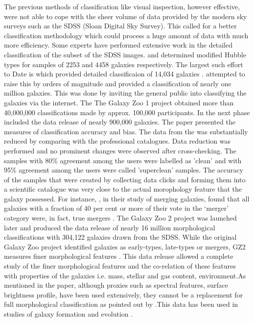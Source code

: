 \documentclass[fleqn,usenatbib]{mnras}
\begin{document}
The previous methods of classification like visual inspection, however effective, were not able to cope with the sheer volume of data provided by the modern sky surveys such as the SDSS (Sloan Digital Sky Survey). This called for a better classification methodology which could process a huge amount of data with much more efficiency. Some experts have performed extensive work in the detailed classification of the subset of the SDSS images. \citet{2007AJ....134..579F} and \citet{refId0} determined modified Hubble types for samples of 2253 and 4458 galaxies respectively. The largest such effort to Date is \citet{2010ApJS..186..427N} which provided detailed classificaion of 14,034 galaxies \citep{Willett_2013}. \citet{2008MNRAS.389.1179L} attempted to raise this by orders of magnitude and provided a classification of nearly one million galaxies. This was done by inviting the general public into classifying the galaxies via the internet. The The Galaxy Zoo 1 project obtained more than 40,000,000 classifications made by approx. 100,000 participants. In the next phase \citet{Lintott_2010} included the data release of nearly 900,000 galaxies. The paper presented the measures of classification accuracy and bias. The data from the \citet{2008MNRAS.389.1179L} was substantially reduced by comparing with the professional catalogues. Data reduction was performed and no prominent changes were observed after cross-checking. The samples with 80\% agreement among the users were labelled as 'clean' and with 95\% agreement among the users were called 'superclean' samples. The accuracy of the samples that were created by collecting data clicks and forming them into a scientific catalogue was very close to the actual morophology feature that the galaxy possessed. For instance, \citet{2010MNRAS.401.1552D}, in their study of merging galaxies, found that
all galaxies with a fraction of 40 per cent or more of their vote in the
‘merger’ category were, in fact, true mergers \citep{Lintott_2010}. The Galaxy Zoo 2 project was launched later and \citet{Willett_2013} produced the data release of nearly 16 million morphological classifications with 304,122 galaxies drawn from the SDSS. While the original Galaxy Zoo project identified galaxies as early-types, late-types or mergers, GZ2 measures finer morphological features \citep{Willett_2013}. This data release allowed a complete study of the finer morphological features and the co-relation of these features with properties of the galaxies i.e. mass, stellar and gas content, environment.As mentioned in the paper, although proxies such as spectral features, surface brightness profile, have been used extensively, they cannot be a replacement for full morphological classification as pointed out by \citet{Lintott_2010}.This data has been used in studies of galaxy formation and evolution \citep{Land_et_all_2008,Schawinski,Willett_2015}. 
\end{document}
